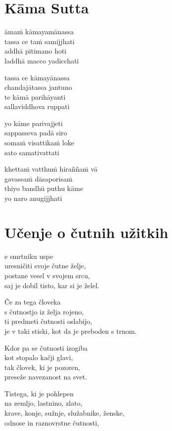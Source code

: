 

\cleartoverso
\chapter*{Kāma Sutta}

āmaṁ kāmayamānassa\\
tassa ce taṁ samijjhati\\
addhā pītimano hoti\\
laddhā macco yadicchati

tassa ce kāmayānassa\\
chandajātassa jantuno\\
te kāmā parihāyanti\\
sallaviddhova ruppati

yo kāme parivajjeti\\
sappasseva padā siro\\
somaṁ visattikaṁ loke\\
sato samativattati

khettaṁ vatthuṁ hiraññaṁ vā\\
gavassaṁ dāsaporisaṁ\\
thiyo bandhū puthu kāme\\
yo naro anugijjhati


\cleartorecto
\chapter{Učenje o čutnih užitkih}

e smrtniku uspe\\
uresničiti svoje čutne želje,\\
postane vesel v svojem srcu,\\
saj je dobil tisto, kar si je želel.

Če za tega človeka\\
s čutnostjo iz želja rojeno,\\
ti predmeti čutnosti oslabijo,\\
je v taki stiski, kot da je preboden s trnom.

Kdor pa se čutnosti izogiba\\
kot stopalo kačji glavi,\\
tak človek, ki je pozoren,\\
preseže navezanost na svet.

Tistega, ki je pohlepen\\
na zemljo, lastnino, zlato,\\
krave, konje, sužnje, služabnike, ženske,\\
odnose in raznovrstne čutnosti,

